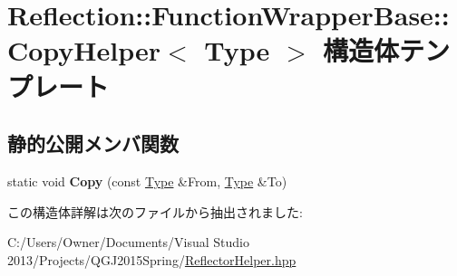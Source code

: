 \hypertarget{struct_reflection_1_1_function_wrapper_base_1_1_copy_helper}{}\section{Reflection\+:\+:Function\+Wrapper\+Base\+:\+:Copy\+Helper$<$ Type $>$ 構造体テンプレート}
\label{struct_reflection_1_1_function_wrapper_base_1_1_copy_helper}
\subsection*{静的公開メンバ関数}
\begin{DoxyCompactItemize}
\item 
static void {\bfseries Copy} (const \hyperlink{class_reflection_1_1_type}{Type} \&From, \hyperlink{class_reflection_1_1_type}{Type} \&To)\hypertarget{struct_reflection_1_1_function_wrapper_base_1_1_copy_helper_a68073905befde5b79bae8dffc36b7b98}{}\label{struct_reflection_1_1_function_wrapper_base_1_1_copy_helper_a68073905befde5b79bae8dffc36b7b98}

\end{DoxyCompactItemize}


この構造体詳解は次のファイルから抽出されました\+:\begin{DoxyCompactItemize}
\item 
C\+:/\+Users/\+Owner/\+Documents/\+Visual Studio 2013/\+Projects/\+Q\+G\+J2015\+Spring/\hyperlink{_reflector_helper_8hpp}{Reflector\+Helper.\+hpp}\end{DoxyCompactItemize}
